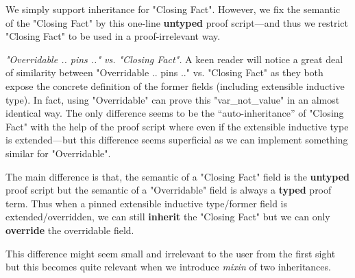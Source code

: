 We simply support inheritance for "Closing Fact". However, we fix the semantic of the "Closing Fact" by this one-line \textbf{untyped} proof script---and thus we restrict "Closing Fact" to be used in a proof-irrelevant way.

\textit{"Overridable .. pins {..}" vs. "Closing Fact".} A keen reader will notice a great deal of similarity between "Overridable .. pins {..}" vs. "Closing Fact" as they both expose the concrete definition of the former fields (including extensible inductive type). In fact, using "Overridable" can prove this "var_not_value" in an almost identical way. The only difference seems to be the ``auto-inheritance'' of "Closing Fact" with the help of the proof script where even if the extensible inductive type is extended---but this difference seems superficial as we can implement something similar for "Overridable".

The main difference is that, the semantic of a "Closing Fact" field is the \textbf{untyped} proof script but the semantic of a "Overridable" field is always a \textbf{typed} proof term. Thus when a pinned extensible inductive type/former field is extended/overridden, we can still \textbf{inherit} the "Closing Fact" but we can only \textbf{override} the overridable field.

This difference might seem small and irrelevant to the user from the first sight but this becomes quite relevant when we introduce \textit{mixin} of two inheritances.



